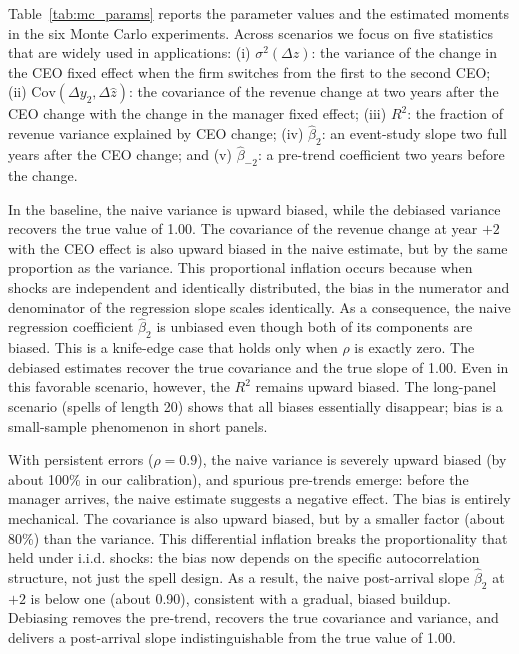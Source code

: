 \documentclass[11pt,a4paper]{article}
\begin{document}
Table~\ref{tab:mc_params} reports the parameter values and the estimated moments in the six Monte Carlo experiments. Across scenarios we focus on five statistics that are widely used in applications: (i) $\sigma^2(\Delta \hat z)$: the variance of the change in the CEO fixed effect when the firm switches from the first to the second CEO; (ii) $ \mathrm{Cov}(\Delta y_2, \Delta \hat z)$: the covariance of the revenue change at two years after the CEO change with the change in the manager fixed effect; (iii) $ R^2$: the fraction of revenue variance explained by CEO change; (iv) $\hat \beta_2$: an event-study slope two full years after the CEO change; and (v)  $\hat \beta_{-2}$: a pre-trend coefficient two years before the change.

In the baseline, the naive variance is upward biased, while the debiased variance recovers the true value of 1.00. The covariance of the revenue change at year $+2$ with the CEO effect is also upward biased in the naive estimate, but by the same proportion as the variance. This proportional inflation occurs because when shocks are independent and identically distributed, the bias in the numerator and denominator of the regression slope scales identically. As a consequence, the naive regression coefficient $\hat\beta_2$ is unbiased even though both of its components are biased. This is a knife-edge case that holds only when $\rho$ is exactly zero. The debiased estimates recover the true covariance and the true slope of 1.00. Even in this favorable scenario, however, the $R^2$ remains upward biased. The long-panel scenario (spells of length 20) shows that all biases essentially disappear; bias is a small-sample phenomenon in short panels.

With persistent errors ($\rho=0.9$), the naive variance is severely upward biased (by about 100\% in our calibration), and spurious pre-trends emerge: before the manager arrives, the naive estimate suggests a negative effect. The bias is entirely mechanical. The covariance is also upward biased, but by a smaller factor (about 80\%) than the variance. This differential inflation breaks the proportionality that held under i.i.d. shocks: the bias now depends on the specific autocorrelation structure, not just the spell design. As a result, the naive post-arrival slope $\hat\beta_2$ at $+2$ is below one (about 0.90), consistent with a gradual, biased buildup. Debiasing removes the pre-trend, recovers the true covariance and variance, and delivers a post-arrival slope indistinguishable from the true value of 1.00.
\end{document}

